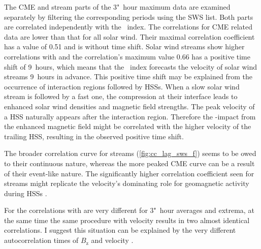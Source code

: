 \pagebreak

The CME and stream parts of the 3"~hour maximum data are examined separately by filtering the corresponding periods using the SWS list. Both parts are correlated independently with the \Kp~index. The correlations for CME related data are lower than that for all solar wind. Their maximal correlation coefficient has a value of 0.51 and is without time shift.
Solar wind streams show higher correlations with \Kp{} and the correlation's maximum value 0.66 has a positive time shift of 9~hours, which means that the \Kp~index forecasts the velocity of solar wind streams 9~hours in advance.
This positive time shift may be explained from the occurrence of interaction regions followed by HSSs. When a slow solar wind stream is followed by a fast one, the compression at their interface leads to enhanced solar wind densities and magnetic field strengths. The peak velocity of a HSS naturally appears after the interaction region. Therefore the \Kp-impact from the enhanced magnetic field might be correlated with the higher velocity of the trailing HSS, resulting in the observed positive time shift.

The broader correlation curve for streams (\autoref{fig:cc_lag_sws_f}) seems to be owed to their continuous nature, whereas the more peaked CME curve can be a result of their event-like nature. The significantly higher correlation coefficient seen for streams might replicate the velocity's dominating role for geomagnetic activity during HSSs \citep{Holappa2014}.

For \vBz{} the correlations with \Kp{} are very different for 3"~hour averages and extrema, at the same time the same procedure with velocity results in two almost identical correlations. I suggest this situation can be explained by the very different autocorrelation times of $B_\text{z}$ and velocity \citep{Elliott2013}.


